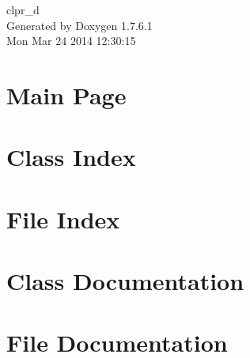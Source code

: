 \documentclass[a4paper]{book}
\begin{document}
\hypersetup{pageanchor=false,citecolor=blue}
\begin{titlepage}
\vspace*{7cm}
\begin{center}
{\Large clpr\-\_\-d }\\
\vspace*{1cm}
{\large \-Generated by Doxygen 1.7.6.1}\\
\vspace*{0.5cm}
{\small Mon Mar 24 2014 12:30:15}\\
\end{center}
\end{titlepage}
\clearemptydoublepage
{}
\tableofcontents
\clearemptydoublepage
{}
\hypersetup{pageanchor=true,citecolor=blue}
\chapter{\-Main \-Page}
\label{index}\hypertarget{index}{}
\chapter{\-Class \-Index}

\chapter{\-File \-Index}

\chapter{\-Class \-Documentation}
























\chapter{\-File \-Documentation}









\printindex
\end{document}

